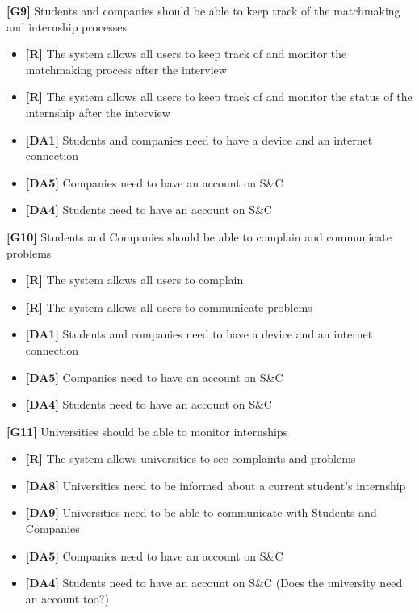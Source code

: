 \textbf{[G9]} Students and companies should be able to keep track of the matchmaking and internship processes
\begin{itemize}
    \item \textbf{[R]} The system allows all users to keep track of and monitor the matchmaking process
    after the interview
    \item \textbf{[R]} The system allows all users to keep track of and monitor the status of the internship
    after the interview
    
    \item \textbf{[DA1]} Students and companies need to have a device and an internet connection
    \item \textbf{[DA5]} Companies need to have an account on S\&C
    \item \textbf{[DA4]} Students need to have an account on S\&C
\end{itemize}

\textbf{[G10]} Students and Companies should be able to complain and communicate problems
\begin{itemize}
    \item \textbf{[R]} The system allows all users to complain
    \item \textbf{[R]} The system allows all users to communicate problems
    
    \item \textbf{[DA1]} Students and companies need to have a device and an internet connection
    \item \textbf{[DA5]} Companies need to have an account on S\&C
    \item \textbf{[DA4]} Students need to have an account on S\&C
\end{itemize}

\textbf{[G11]} Universities should be able to monitor internships
\begin{itemize}
    \item \textbf{[R]} The system allows universities to see complaints and problems
    
    \item \textbf{[DA8]} Universities need to be informed about a current student’s internship
    \item \textbf{[DA9]} Universities need to be able to communicate with Students and Companies
    \item \textbf{[DA5]} Companies need to have an account on S\&C
    \item \textbf{[DA4]} Students need to have an account on S\&C
    (Does the university need an account too?)
\end{itemize}

